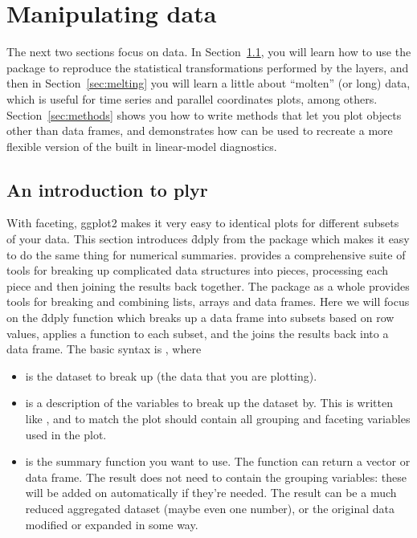 

% 


\chapter{Manipulating data}
\label{cha:data}

The next two sections focus on data.  In Section~\ref{sec:plyr}, you will learn how to use the  package to reproduce the statistical transformations performed by the layers, and then in Section~\ref{sec:melting} you will learn a little about ``molten'' (or long) data, which is useful for time series and parallel coordinates plots, among others.  Section~\ref{sec:methods} shows you how to write methods that let you plot objects other than data frames, and demonstrates how \ggplot can be used to recreate a more flexible version of the built in linear-model diagnostics.  

\section{An introduction to plyr}
\label{sec:plyr}

With faceting, ggplot2 makes it very easy to identical plots for different subsets of your data. This section introduces \f{ddply} from the  package which makes it easy to do the same thing for numerical summaries.  provides a comprehensive suite of tools for breaking up complicated data structures into pieces, processing each piece and then joining the results back together. The  package as a whole provides tools for breaking and combining lists, arrays and data frames. Here we will focus on the \f{ddply} function which breaks up a data frame into subsets based on row values, applies a function to each subset, and the joins the results back into a data frame. The basic syntax is , where

\begin{itemize}
  \item {} is the dataset to break up (the data that you are plotting).
  
  \item {} is a description of the variables to break up the dataset by.  This is written like , and to match the plot should contain all grouping and faceting variables used in the plot.
  
  \item {} is the summary function you want to use.  The function can return a vector or data frame.  The result does not need to contain the grouping variables: these will be added on automatically if they're needed.  The result can be a much reduced aggregated dataset (maybe even one number), or the original data modified or expanded in some way.

\end{itemize}

